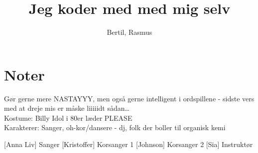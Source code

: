 \documentclass{article}
\title{Jeg koder med med mig selv}                   %
\author{Bertil, Rasmus}  %
\begin{document}
                
\maketitle
\section*{Noter}                %
Gør gerne mere NASTAYYY, men også gerne intelligent i ordspillene - sidste vers med at dreje mis er måske liiiiidt sådan…\\
Kostume: Billy Idol i 80er læder PLEASE\\
Karakterer: Sanger, oh-kor/dansere - dj, folk der boller til organisk kemi


\begin{roles}
[Anna Liv] Sanger
[Kristoffer] Korsanger 1
[Johnson] Korsanger 2 
[Sia] Instruktør
\end{roles}

\begin{props}
\end{props}

\newpage
\end{document}
